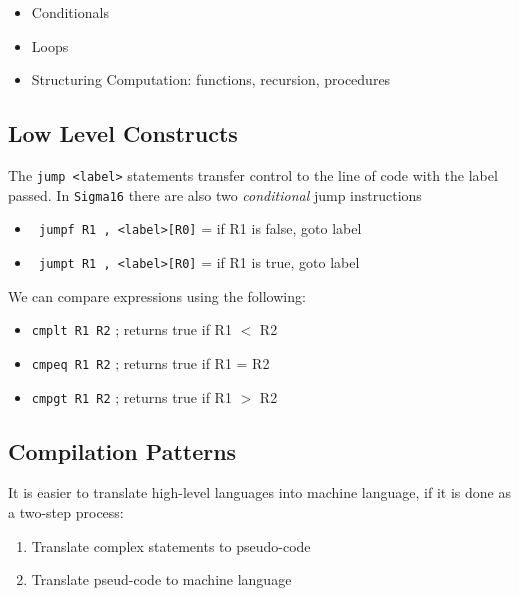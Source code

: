 \documentclass[english,course]{Notes}
\newcommand{\ita}[1]{\textit{#1}}
\newcommand{\code}{\texttt}
\begin{document}
\begin{itemize}
	\item{Conditionals}
	\item{Loops}
	\item{Structuring Computation: functions, recursion, procedures}
\end{itemize}

\subsection{Low Level Constructs}

\par{The \code{jump <label>} statements transfer control to the line of code with the label passed. In \code{Sigma16} there are also two \ita{conditional} jump instructions}

\begin{itemize}
	\item[]\code{ jumpf R1 , <label>[R0]} = if R1 is false, goto label
	\item[]\code{ jumpt R1 , <label>[R0]} = if R1 is true, goto label
\end{itemize}


\par{We can compare expressions using the following:}

\begin{itemize}
	\item[]\code{cmplt R1 R2} ; returns true if R1 $<$ R2
	\item[]\code{cmpeq R1 R2} ; returns true if R1 = R2	
	\item[]\code{cmpgt R1 R2} ; returns true if R1 $>$ R2
\end{itemize}

\subsection{Compilation Patterns}

\par{It is easier to translate high-level languages into machine language, if it is done as a two-step process:}
\begin{enumerate}
	\item Translate complex statements to pseudo-code
	\item Translate pseud-code to machine language
\end{enumerate}
\end{document}
